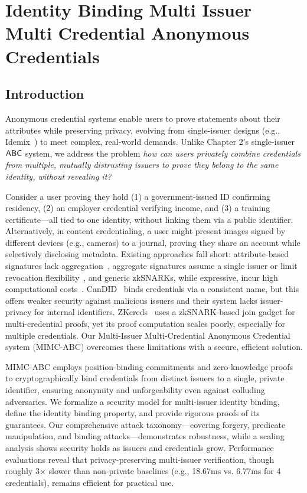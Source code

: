 \chapter{Identity Binding Multi Issuer Multi Credential Anonymous Credentials}\label{chap3}

\section{Introduction}\label{sec:mimc}
Anonymous credential systems enable users to prove statements about their attributes while preserving privacy, evolving from single-issuer designs (e.g., Idemix~\cite{camenisch_design_2002}) to meet complex, real-world demands. Unlike Chapter 2's single-issuer $\mathsf{ABC}$ system, we address the problem \emph{how can users privately combine credentials from multiple, mutually distrusting issuers to prove they belong to the same identity, without revealing it?}

Consider a user proving they hold (1) a government-issued ID confirming residency, (2) an employer credential verifying income, and (3) a training certificate—all tied to one identity, without linking them via a public identifier. Alternatively, in content credentialing, a user might present images signed by different devices (e.g., cameras) to a journal, proving they share an account while selectively disclosing metadata. Existing approaches fall short: attribute-based signatures lack aggregation~\cite{cimato_signature_2003}, aggregate signatures assume a single issuer \cite{goos_short_2001, hutchison_short_2004} or limit revocation flexibility~\cite{galdi_traceable_2022}, and generic zkSNARKs, while expressive, incur high computational costs~\cite{rosenberg_zk-creds_2022}. CanDID~\cite{maram_candid_2020} binds credentials via a consistent name, but this offers weaker security against malicious issuers and their system lacks issuer-privacy for internal identifiers. ZKcreds~\cite{rosenberg_zk-creds_2022} uses a zkSNARK-based join gadget for multi-credential proofs, yet its proof computation scales poorly, especially for multiple credentials. Our Multi-Issuer Multi-Credential Anonymous Credential system (MIMC-ABC) overcomes these limitations with a secure, efficient solution.

MIMC-ABC employs position-binding commitments and zero-knowledge proofs to cryptographically bind credentials from distinct issuers to a single, private identifier, ensuring anonymity and unforgeability even against colluding adversaries. We formalize a security model for multi-issuer identity binding, define the identity binding property, and provide rigorous proofs of its guarantees. Our comprehensive attack taxonomy—covering forgery, predicate manipulation, and binding attacks—demonstrates robustness, while a scaling analysis shows security holds as issuers and credentials grow. Performance evaluations reveal that privacy-preserving multi-issuer verification, though roughly 3× slower than non-private baselines (e.g., 18.67ms vs. 6.77ms for 4 credentials), remains efficient for practical use.


